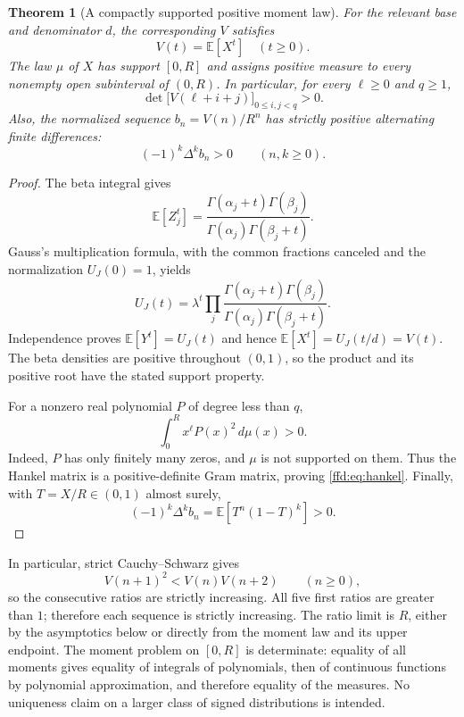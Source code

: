 \documentclass[11pt]{article}
\newtheorem{theorem}{Theorem}[section]
\theoremstyle{definition}
\theoremstyle{remark}
\newcommand{\E}{\mathbb E}
\begin{document}
\begin{theorem}[A compactly supported positive moment law]\label{ffd:thm:moments}
For the relevant base and denominator $d$, the corresponding $V$ satisfies
\begin{equation}
 V(t)=\E[X^t]\quad(t\ge0).
 \label{ffd:eq:moment}
\end{equation}
The law $\mu$ of $X$ has support $[0,R]$ and assigns positive measure to every
nonempty open subinterval of $(0,R)$. In particular, for every $\ell\ge0$ and
$q\ge1$,
\begin{equation}
 \det\bigl[V(\ell+i+j)\bigr]_{0\le i,j<q}>0.
 \label{ffd:eq:hankel}
\end{equation}
Also, the normalized sequence $b_n=V(n)/R^n$ has strictly positive alternating
finite differences:
\begin{equation}
 (-1)^k\Delta^k b_n>0\qquad(n,k\ge0).
 \label{ffd:eq:hausdorff}
\end{equation}
\end{theorem}
\begin{proof}
The beta integral gives
\[
 \E[Z_j^t]=\frac{\Gamma(\alpha_j+t)\Gamma(\beta_j)}
 {\Gamma(\alpha_j)\Gamma(\beta_j+t)}.
\]
Gauss's multiplication formula, with the common fractions canceled and the
normalization $U_J(0)=1$, yields
\[
 U_J(t)=\lambda^t\prod_j
 \frac{\Gamma(\alpha_j+t)\Gamma(\beta_j)}
 {\Gamma(\alpha_j)\Gamma(\beta_j+t)}.
\]
Independence proves $\E[Y^t]=U_J(t)$ and hence
$\E[X^t]=U_J(t/d)=V(t)$.
The beta densities are positive throughout $(0,1)$, so the product and its
positive root have the stated support property.

For a nonzero real polynomial $P$ of degree less than $q$,
\[
 \int_0^R x^\ell P(x)^2\,d\mu(x)>0.
\]
Indeed, $P$ has only finitely many zeros, and $\mu$ is not supported on them.
Thus the Hankel matrix is a positive-definite Gram matrix, proving
\eqref{ffd:eq:hankel}. Finally, with $T=X/R\in(0,1)$ almost surely,
\[
 (-1)^k\Delta^k b_n=\E[T^n(1-T)^k]>0.
\]
\end{proof}

In particular, strict Cauchy--Schwarz gives
\begin{equation}
 V(n+1)^2<V(n)V(n+2)\qquad(n\ge0),
 \label{ffd:eq:logconvex}
\end{equation}
so the consecutive ratios are strictly increasing. All five first ratios are
greater than $1$; therefore each sequence is strictly increasing. The ratio
limit is $R$, either by the asymptotics below or directly from the moment law
and its upper endpoint. The moment problem on $[0,R]$ is determinate: equality
of all moments gives equality of integrals of polynomials, then of continuous
functions by polynomial approximation, and therefore equality of the measures.
No uniqueness claim on a larger class of signed distributions is intended.
\end{document}
